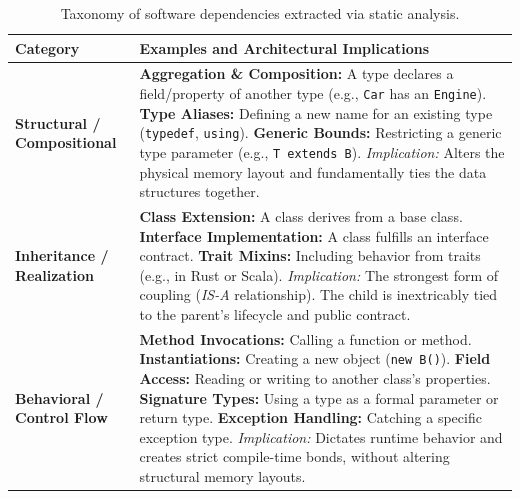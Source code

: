 \begin{table}[ht]
  \small
  \centering
  \renewcommand{\arraystretch}{1.5}
  \begin{tabularx}{\textwidth}{|p{}|X|}
    \hline
    \textbf{Category} & \textbf{Examples and Architectural Implications} \\
    \hline
    \textbf{Structural / Compositional} & \textbf{Aggregation \&
    Composition:} A type declares a field/property of another type
    (e.g., \texttt{Car} has an \texttt{Engine}).\newline
    \textbf{Type Aliases:} Defining a new name for an existing type
    (\texttt{typedef}, \texttt{using}).\newline
    \textbf{Generic Bounds:} Restricting a generic type parameter
    (e.g., \texttt{T extends B}).\newline
    \textit{Implication:} Alters the physical memory layout and
    fundamentally ties the data structures together. \\
    \hline
    \textbf{Inheritance / Realization} & \textbf{Class Extension:} A
    class derives from a base class.\newline
    \textbf{Interface Implementation:} A class fulfills an interface
    contract.\newline
    \textbf{Trait Mixins:} Including behavior from traits (e.g., in
    Rust or Scala).\newline
    \textit{Implication:} The strongest form of coupling
    (\textit{IS-A} relationship). The child is inextricably tied to
    the parent's lifecycle and public contract. \\
    \hline
    \textbf{Behavioral / Control Flow} & \textbf{Method Invocations:}
    Calling a function or method.\newline
    \textbf{Instantiations:} Creating a new object (\texttt{new B()}).\newline
    \textbf{Field Access:} Reading or writing to another class's
    properties.\newline
    \textbf{Signature Types:} Using a type as a formal parameter or
    return type.\newline
    \textbf{Exception Handling:} Catching a specific exception type.\newline
    \textit{Implication:} Dictates runtime behavior and creates
    strict compile-time bonds, without altering structural memory layouts. \\
    \hline
  \end{tabularx}
  \caption{Taxonomy of software dependencies extracted via static analysis.}
  \label{tab:dependency_types}
\end{table}

